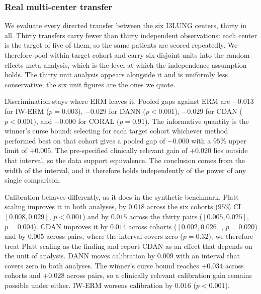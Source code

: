 
\subsubsection{Real multi-center transfer}
We evaluate every directed transfer between the six I3LUNG centers, thirty in
all. Thirty transfers carry fewer than thirty independent observations: each
center is the target of five of them, so the same patients are scored
repeatedly. We therefore pool within target cohort and carry six disjoint units
into the random effects meta-analysis, which is the level at which the
independence assumption holds. The thirty unit analysis appears alongside it
and is uniformly less conservative; the six unit figures are the ones we quote.

Discrimination stays where ERM leaves it. Pooled gaps against ERM are $-0.013$
for IW-ERM ($p=0.003$), $-0.029$ for DANN ($p<0.001$), $-0.029$ for CDAN
($p<0.001$), and $-0.000$ for CORAL ($p=0.91$). The informative quantity is the
winner's curse bound: selecting for each target cohort whichever method
performed best on that cohort gives a pooled gap of $-0.000$ with a $95\%$
upper limit of $+0.005$. The pre-specified clinically relevant gain of $+0.020$
lies outside that interval, so the data support equivalence. The conclusion
comes from the width of the interval, and it therefore holds independently of
the power of any single comparison.

Calibration behaves differently, as it does in the synthetic benchmark. Platt
scaling improves it in both analyses, by $0.018$ across the six cohorts ($95\%$
CI $[0.008, 0.029]$, $p<0.001$) and by $0.015$ across the thirty pairs
($[0.005, 0.025]$, $p=0.004$). CDAN improves it by $0.014$ across cohorts
($[0.002, 0.026]$, $p=0.020$) and by $0.005$ across pairs, where the interval
covers zero ($p=0.32$); we therefore treat Platt scaling as the finding and
report CDAN as an effect that depends on the unit of analysis. DANN moves
calibration by $0.009$ with an interval that covers zero in both analyses. The
winner's curse bound reaches $+0.034$ across cohorts and $+0.028$ across pairs,
so a clinically relevant calibration gain remains possible under either. IW-ERM
worsens calibration by $0.016$ ($p<0.001$).

